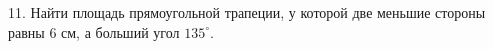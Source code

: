 11. Найти площадь прямоугольной трапеции, у которой две меньшие стороны равны 6 см, а больший угол $135^\circ.$\\
